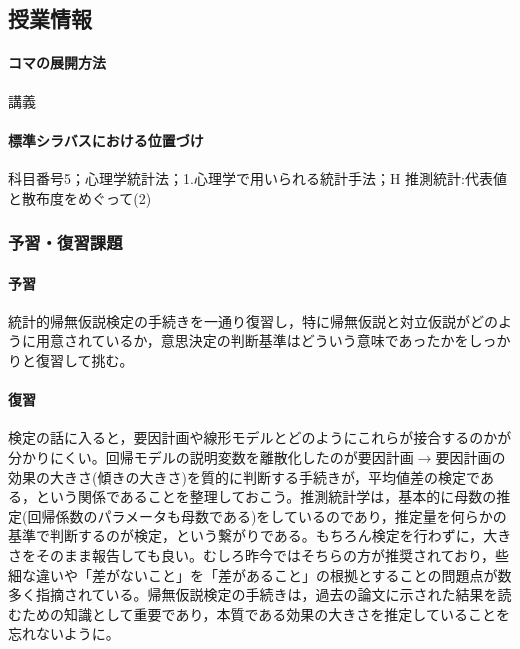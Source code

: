 \subsection{授業情報}
\paragraph{コマの展開方法}
講義
\paragraph{標準シラバスにおける位置づけ}
科目番号5；心理学統計法；1.心理学で用いられる統計手法；H 推測統計:代表値と散布度をめぐって(2)
\subsubsection{予習・復習課題}
\paragraph{予習}
統計的帰無仮説検定の手続きを一通り復習し，特に帰無仮説と対立仮説がどのように用意されているか，意思決定の判断基準はどういう意味であったかをしっかりと復習して挑む。
\paragraph{復習}
検定の話に入ると，要因計画や線形モデルとどのようにこれらが接合するのかが分かりにくい。回帰モデルの説明変数を離散化したのが要因計画$\to$要因計画の効果の大きさ(傾きの大きさ)を質的に判断する手続きが，平均値差の検定である，という関係であることを整理しておこう。推測統計学は，基本的に母数の推定(回帰係数のパラメータも母数である)をしているのであり，推定量を何らかの基準で判断するのが検定，という繋がりである。もちろん検定を行わずに，大きさをそのまま報告しても良い。むしろ昨今ではそちらの方が推奨されており，些細な違いや「差がないこと」を「差があること」の根拠とすることの問題点が数多く指摘されている。帰無仮説検定の手続きは，過去の論文に示された結果を読むための知識として重要であり，本質である効果の大きさを推定していることを忘れないように。